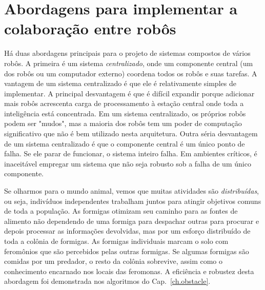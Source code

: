 \section{Abordagens para implementar a colaboração entre robôs}

Há duas abordagens principais para o projeto de sistemas compostos de vários robôs. A primeira é um sistema \textit{centralizado}, onde um componente central (um dos robôs ou um computador externo) coordena todos os robôs e suas tarefas. A vantagem de um sistema centralizado é que ele é relativamente simples de implementar. A principal desvantagem é que é difícil expandir porque adicionar mais robôs acrescenta carga de processamento à estação central onde toda a inteligência está concentrada. Em um sistema centralizado, os próprios robôs podem ser "mudos", mas a maioria dos robôs tem um poder de computação significativo que não é bem utilizado nesta arquitetura. Outra séria desvantagem de um sistema centralizado é que o componente central é um único ponto de falha. Se ele parar de funcionar, o sistema inteiro falha. Em ambientes críticos, é inaceitável empregar um sistema que não seja robusto sob a falha de um único componente.

Se olharmos para o mundo animal, vemos que muitas atividades são \emph{distribuídas}, ou seja, indivíduos independentes trabalham juntos para atingir objetivos comuns de toda a população. As formigas otimizam seu caminho para as fontes de alimento não dependendo de uma formiga para despachar outras para procurar e depois processar as informações devolvidas, mas por um esforço distribuído de toda a colônia de formigas. As formigas individuais marcam o solo com feromônios que são percebidos pelas outras formigas. Se algumas formigas são comidas por um predador, o resto da colônia sobrevive, assim como o conhecimento encarnado nos locais das feromonas. A eficiência e robustez desta abordagem foi demonstrada nos algoritmos do Cap.~\ref{ch.obstacle}.

